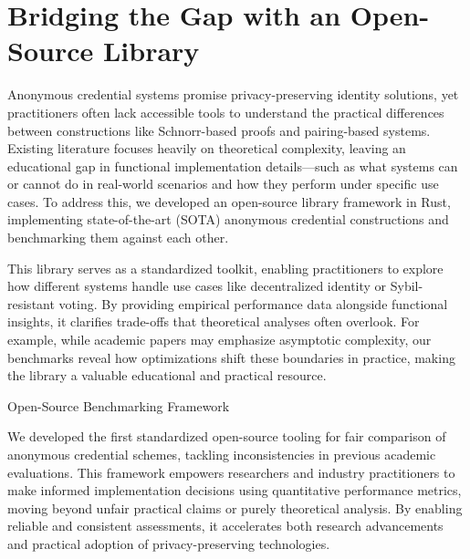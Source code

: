 \section{Bridging the Gap with an Open-Source Library}

Anonymous credential systems promise privacy-preserving identity solutions, yet practitioners often lack accessible tools to understand the practical differences between constructions like Schnorr-based proofs and pairing-based systems. Existing literature focuses heavily on theoretical complexity, leaving an educational gap in functional implementation details—such as what systems can or cannot do in real-world scenarios and how they perform under specific use cases. To address this, we developed an open-source library framework in Rust, implementing state-of-the-art (SOTA) anonymous credential constructions and benchmarking them against each other.

This library serves as a standardized toolkit, enabling practitioners to explore how different systems handle use cases like decentralized identity or Sybil-resistant voting. By providing empirical performance data alongside functional insights, it clarifies trade-offs that theoretical analyses often overlook. For example, while academic papers may emphasize asymptotic complexity, our benchmarks reveal how optimizations shift these boundaries in practice, making the library a valuable educational and practical resource.

Open-Source Benchmarking Framework

We developed the first standardized open-source tooling for fair comparison of anonymous credential schemes, tackling inconsistencies in previous academic evaluations. This framework empowers researchers and industry practitioners to make informed implementation decisions using quantitative performance metrics, moving beyond unfair practical claims or purely theoretical analysis. By enabling reliable and consistent assessments, it accelerates both research advancements and practical adoption of privacy-preserving technologies.










